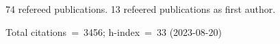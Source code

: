 74 refereed publications. 13 refeered publications as first author.

Total citations~=~3456; h-index~=~33 (2023-08-20)